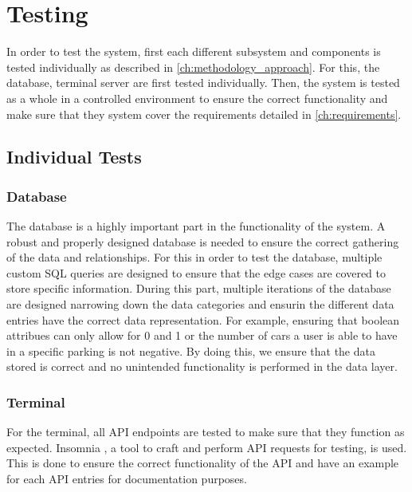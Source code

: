\chapter{Testing}\label{ch:testing}

In order to test the system, first each different subsystem and components is tested individually as described in \cref{ch:methodology_approach}. For this, the database, terminal  server are first tested individually. Then, the system is tested as a whole in a controlled environment to ensure the correct functionality and make sure that they system cover the requirements detailed in \cref{ch:requirements}.

\section{Individual Tests}

\subsection{Database}

The database is a highly important part in the functionality of the system. A robust and properly designed database is needed to ensure the correct gathering of the data and relationships. For this in order to test the database, multiple custom SQL queries are designed to ensure that the edge cases are covered to store specific information. During this part, multiple iterations of the database are designed narrowing down the data categories and ensurin the different data entries have the correct data representation. For example, ensuring that boolean attribues can only allow for 0 and 1 or the number of cars a user is able to have in a specific parking is not negative. By doing this, we ensure that the data stored is correct and no unintended functionality is performed in the data layer.

\subsection{Terminal}

For the terminal, all API endpoints are tested to make sure that they function as expected. Insomnia , a tool to craft and perform API requests for testing, is used. This is done to ensure the correct functionality of the API and have an example for each API entries for documentation purposes.


